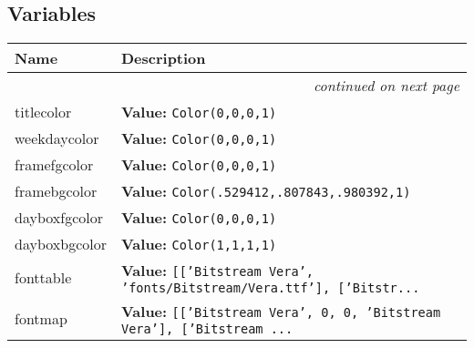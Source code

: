 
  \subsection{Variables}

    \vspace{-1cm}
\hspace{\varindent}\begin{longtable}{|p{\varnamewidth}|p{\vardescrwidth}|l}
\cline{1-2}
\cline{1-2} \centering \textbf{Name} & \centering \textbf{Description}& \\
\cline{1-2}
\endhead\cline{1-2}\multicolumn{3}{r}{\small\textit{continued on next page}}\\\endfoot\cline{1-2}
\endlastfoot\raggedright t\-i\-t\-l\-e\-c\-o\-l\-o\-r\- & \raggedright \textbf{Value:} 
{\tt Color(0,0,0,1)}&\\
\cline{1-2}
\raggedright w\-e\-e\-k\-d\-a\-y\-c\-o\-l\-o\-r\- & \raggedright \textbf{Value:} 
{\tt Color(0,0,0,1)}&\\
\cline{1-2}
\raggedright f\-r\-a\-m\-e\-f\-g\-c\-o\-l\-o\-r\- & \raggedright \textbf{Value:} 
{\tt Color(0,0,0,1)}&\\
\cline{1-2}
\raggedright f\-r\-a\-m\-e\-b\-g\-c\-o\-l\-o\-r\- & \raggedright \textbf{Value:} 
{\tt Color(.529412,.807843,.980392,1)}&\\
\cline{1-2}
\raggedright d\-a\-y\-b\-o\-x\-f\-g\-c\-o\-l\-o\-r\- & \raggedright \textbf{Value:} 
{\tt Color(0,0,0,1)}&\\
\cline{1-2}
\raggedright d\-a\-y\-b\-o\-x\-b\-g\-c\-o\-l\-o\-r\- & \raggedright \textbf{Value:} 
{\tt Color(1,1,1,1)}&\\
\cline{1-2}
\raggedright f\-o\-n\-t\-t\-a\-b\-l\-e\- & \raggedright \textbf{Value:} 
{\tt \texttt{[}\texttt{[}\texttt{'}\texttt{Bitstream Vera}\texttt{'}\texttt{, }\texttt{'}\texttt{fonts/Bitstream/Vera.ttf}\texttt{'}\texttt{]}\texttt{, }\texttt{[}\texttt{'}\texttt{Bitstr}\texttt{...}}&\\
\cline{1-2}
\raggedright f\-o\-n\-t\-m\-a\-p\- & \raggedright \textbf{Value:} 
{\tt \texttt{[}\texttt{[}\texttt{'}\texttt{Bitstream Vera}\texttt{'}\texttt{, }0\texttt{, }0\texttt{, }\texttt{'}\texttt{Bitstream Vera}\texttt{'}\texttt{]}\texttt{, }\texttt{[}\texttt{'}\texttt{Bitstream }\texttt{...}}&\\

\end{longtable}
